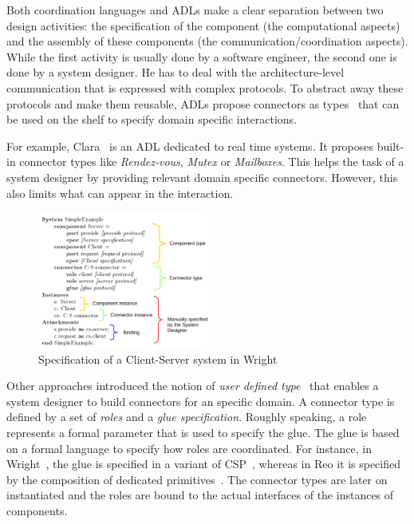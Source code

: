 Both coordination languages and ADLs make a clear separation between two design activities: the specification of the component (\ie the computational aspects) and the assembly of these components (\ie the communication/coordination aspects). While the first activity is usually done by a software engineer, the second one is done by a system designer. He has to deal with the architecture-level communication that is expressed with complex protocols. To abstract away these protocols and make them reusable, ADLs propose connectors as types~\cite{frameadlsbib} that can be used on the shelf to specify domain specific interactions.

For example, Clara~\cite{clarabib} is an ADL dedicated to real time systems. It proposes built-in connector types like \emph{Rendez-vous}, \emph{Mutex} or \emph{Mailboxes}. This helps the task of a system designer by providing relevant domain specific connectors. However, this also limits what can appear in the interaction. 

\begin{figure}
\begin{center}
\includegraphics[width=0.5\textwidth]{background/figs/wrightspec}
\caption{Specification of a Client-Server system in Wright~\cite{wrightbib}}
\label{fig:wrightspec}
\end{center}
\end{figure}

Other approaches introduced the notion of \emph{user defined type}~\cite{uniconbib,wrightbib,reobib} that enables a system designer to build connectors for an specific domain. A connector type is defined by a set of \emph{roles} and a \emph{glue specification}. Roughly speaking, a role represents a formal parameter that is used to specify the glue. The glue is based on a formal language to specify how roles are coordinated. For instance, in Wright~\cite{wrightbib}, the glue is specified in a variant of CSP~\cite{csphoarebib}, whereas in Reo it is specified by the composition of dedicated primitives~\cite{reobib}. The connector types are later on instantiated and the roles are bound to the actual interfaces of the instances of components. 

